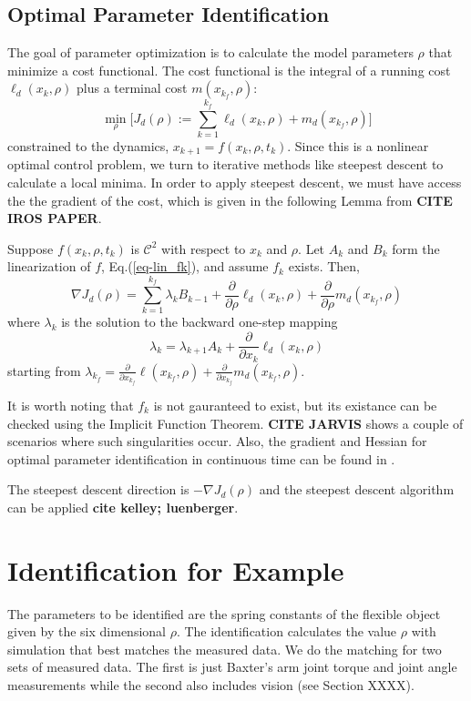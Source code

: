 \documentclass[runningheads,a4paper]{llncs}
\begin{document}
\subsection{Optimal Parameter Identification \label{sec-opt}}
The goal of parameter optimization is to calculate the model parameters $\rho$ that minimize a cost functional.  The cost functional is the integral of a running cost $\ell_d(x_k,\rho)$ plus a terminal cost $m(x_{k_f},\rho)$:
\[
\min_{\rho} \Big[J_d(\rho):=\sum_{k=1}^{k_f}\ell_d(x_k,\rho) + m_d(x_{k_f},\rho)\Big]
\]
constrained to the dynamics, $x_{k+1} = f(x_k,\rho,t_k)$. Since this is a nonlinear optimal control problem, we turn to iterative methods like steepest descent to calculate a local minima. In order to apply steepest descent, we must have access the the gradient of the cost, which is given in the following Lemma from \textbf{CITE IROS PAPER}. 
\begin{lemma}
\label{lem-grad_a}
Suppose $f(x_k,\rho,t_k)$ is $\mathcal{C}^2$ with respect to $x_k$ and $\rho$.  Let $A_k$ and $B_k$ form the linearization of $f$, Eq.(\ref{eq-lin_fk}), and assume $f_k$ exists.  Then,
\begin{equation}
\nabla J_d(\rho) = \sum_{k = 1}^{k_f}\lambda_kB_{k-1} +\frac{\partial}{\partial \rho}\ell_d(x_k,\rho) + \frac{\partial}{\partial \rho}m_d(x_{k_f},\rho)
\label{eq-DJa}
\end{equation}
where $\lambda_k$ is the solution to the backward one-step mapping
\begin{equation}
\lambda_k = \lambda_{k+1}A_{k} + \frac{\partial}{\partial x_{k}}\ell_d(x_{k},\rho) 
\label{eq-lambda}
\end{equation}
starting from $\lambda_{k_f} = \frac{\partial}{\partial x_{k_f}}\ell(x_{k_f},\rho) + \frac{\partial}{\partial x_{k_f}}m_d(x_{k_f},\rho)$.  
\end{lemma}

It is worth noting that $f_k$ is not gauranteed to exist, but its existance can be checked using the Implicit Function Theorem. \textbf{CITE JARVIS} shows a couple of scenarios where such singularities occur.  Also, the gradient and Hessian for optimal parameter identification in continuous time can be found in \cite{miller_murphey}.

The steepest descent direction is $-\nabla J_d(\rho)$ and the steepest descent algorithm can be applied \textbf{cite kelley; luenberger}.

\section{Identification for Example}
The parameters to be identified are the spring constants of the flexible object given by the six dimensional $\rho$.  The identification calculates the value $\rho$ with simulation that best matches the measured data. We do the matching for two sets of measured data.  The first is just Baxter's arm joint torque and joint angle measurements while the second also includes vision (see Section XXXX).  
\end{document}
